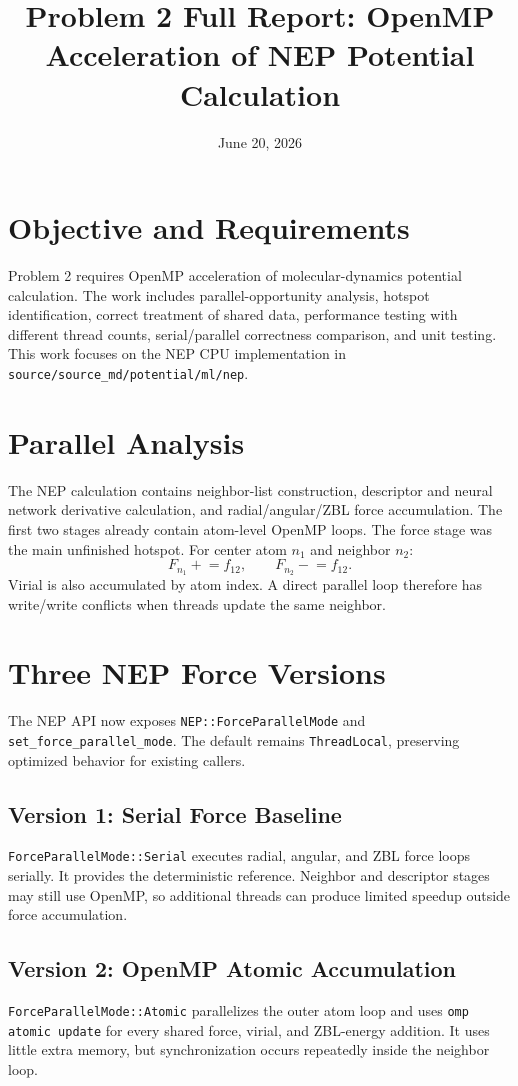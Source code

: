 \documentclass[11pt]{article}
\title{Problem 2 Full Report: OpenMP Acceleration of NEP Potential Calculation}
\author{}
\date{June 20, 2026}
\begin{document}
\maketitle

\section{Objective and Requirements}
Problem 2 requires OpenMP acceleration of molecular-dynamics potential
calculation. The work includes parallel-opportunity analysis, hotspot
identification, correct treatment of shared data, performance testing with
different thread counts, serial/parallel correctness comparison, and unit
testing. This work focuses on the NEP CPU implementation in
\texttt{source/source\_md/potential/ml/nep}.

\section{Parallel Analysis}
The NEP calculation contains neighbor-list construction, descriptor and neural
network derivative calculation, and radial/angular/ZBL force accumulation.
The first two stages already contain atom-level OpenMP loops. The force stage
was the main unfinished hotspot. For center atom $n_1$ and neighbor $n_2$:
\[
F_{n_1}\mathrel{+}=f_{12},\qquad F_{n_2}\mathrel{-}=f_{12}.
\]
Virial is also accumulated by atom index. A direct parallel loop therefore has
write/write conflicts when threads update the same neighbor.

\section{Three NEP Force Versions}
The NEP API now exposes \texttt{NEP::ForceParallelMode} and
\texttt{set\_force\_parallel\_mode}. The default remains
\texttt{ThreadLocal}, preserving optimized behavior for existing callers.

\subsection{Version 1: Serial Force Baseline}
\texttt{ForceParallelMode::Serial} executes radial, angular, and ZBL force
loops serially. It provides the deterministic reference. Neighbor and
descriptor stages may still use OpenMP, so additional threads can produce
limited speedup outside force accumulation.

\subsection{Version 2: OpenMP Atomic Accumulation}
\texttt{ForceParallelMode::Atomic} parallelizes the outer atom loop and uses
\texttt{omp atomic update} for every shared force, virial, and ZBL-energy
addition. It uses little extra memory, but synchronization occurs repeatedly
inside the neighbor loop.
\end{document}
